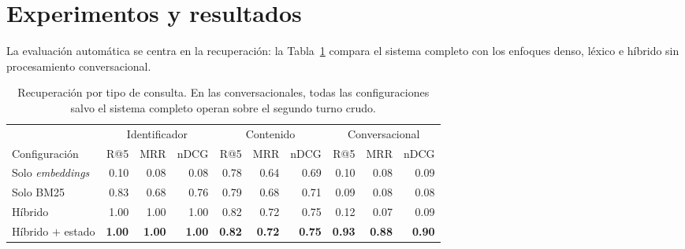 \documentclass{llncs}
\begin{document}
\section{Experimentos y resultados}
\label{sec:resultados}

La evaluación automática se centra en la recuperación: la
Tabla~\ref{tab:ablacion} compara el sistema completo con los enfoques denso,
léxico e híbrido sin procesamiento conversacional.

\begin{table}[H]
\centering\scriptsize
\caption{Recuperación por tipo de consulta. En las conversacionales, todas
las configuraciones salvo el sistema completo operan sobre el segundo turno
crudo.}
\label{tab:ablacion}
\begin{tabular*}{\textwidth}{@{\extracolsep{\fill}}lrrrrrrrrr@{}}
\toprule
 & \multicolumn{3}{c}{Identificador} & \multicolumn{3}{c}{Contenido} & \multicolumn{3}{c}{Conversacional} \\
\cmidrule(lr){2-4}\cmidrule(lr){5-7}\cmidrule(l){8-10}
Configuración & R@5 & MRR & nDCG & R@5 & MRR & nDCG & R@5 & MRR & nDCG \\
\midrule
Solo \emph{embeddings} & 0.10 & 0.08 & 0.08 & 0.78 & 0.64 & 0.69 & 0.10 & 0.08 & 0.09 \\
Solo BM25              & 0.83 & 0.68 & 0.76 & 0.79 & 0.68 & 0.71 & 0.09 & 0.08 & 0.08 \\
Híbrido              & 1.00 & 1.00 & 1.00 & 0.82 & 0.72 & 0.75 & 0.12 & 0.07 & 0.09 \\
Híbrido $+$ estado & \textbf{1.00} & \textbf{1.00} & \textbf{1.00} & \textbf{0.82} & \textbf{0.72} & \textbf{0.75} & \textbf{0.93} & \textbf{0.88} & \textbf{0.90} \\
\bottomrule
\end{tabular*}
\end{table}
\end{document}
